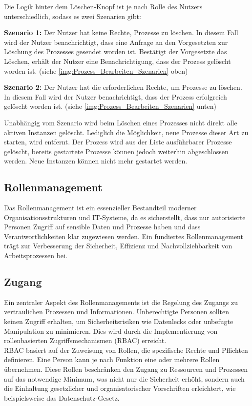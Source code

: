 Die Logik hinter dem Löschen-Knopf ist je nach Rolle des Nutzers unterschiedlich, sodass es zwei Szenarien gibt:

\textbf{Szenario 1:} Der Nutzer hat keine Rechte, Prozesse zu löschen.
In diesem Fall wird der Nutzer benachrichtigt, dass eine Anfrage an den Vorgesetzten zur Löschung des Prozesses gesendet worden ist. Bestätigt der Vorgesetzte das Löschen, erhält der Nutzer eine Benachrichtigung, dass der Prozess gelöscht worden ist. (siehe \autoref{img:Prozess_Bearbeiten_Szenarien} oben)

\textbf{Szenario 2:} Der Nutzer hat die erforderlichen Rechte, um Prozesse zu löschen.
In diesem Fall wird der Nutzer benachrichtigt, dass der Prozess erfolgreich gelöscht worden ist. (siehe \autoref{img:Prozess_Bearbeiten_Szenarien} unten)

Unabhängig vom Szenario wird beim Löschen eines Prozesses nicht direkt alle aktiven Instanzen gelöscht. Lediglich die Möglichkeit, neue Prozesse dieser Art zu starten, wird entfernt. Der Prozess wird aus der Liste ausführbarer Prozesse gelöscht, bereits gestartete Prozesse können jedoch weiterhin abgeschlossen werden. Neue Instanzen können nicht mehr gestartet werden.


\newpage


\subsection{Rollenmanagement} \label{Rollenmanagement}
Das Rollenmanagement ist ein essenzieller Bestandteil moderner Organisationsstrukturen und \ac{IT}-Systeme, da es sicherstellt, dass nur autorisierte Personen Zugriff auf sensible Daten und Prozesse haben und dass Verantwortlichkeiten klar zugewiesen werden. Ein fundiertes Rollenmanagement trägt zur Verbesserung der Sicherheit, Effizienz und Nachvollziehbarkeit von Arbeitsprozessen bei. \cite[Vgl.][]{Sandhu1998} \cite[Vgl.][]{Sandhu}

\subsection*{Zugang}
Ein zentraler Aspekt des Rollenmanagements ist die Regelung des Zugangs zu vertraulichen Prozessen und Informationen. Unberechtigte Personen sollten keinen Zugriff erhalten, um Sicherheitsrisiken wie Datenlecks oder unbefugte Manipulation zu minimieren. Dies wird durch die Implementierung von rollenbasierten Zugriffsmechanismen (\acs{RBAC}) erreicht.\\
\ac{RBAC} basiert auf der Zuweisung von Rollen, die spezifische Rechte und Pflichten definieren. Eine Person kann je nach Funktion eine oder mehrere Rollen übernehmen. Diese Rollen beschränken den Zugang zu Ressourcen und Prozessen auf das notwendige Minimum, was nicht nur die Sicherheit erhöht, sondern auch die Einhaltung gesetzlicher und organisatorischer Vorschriften erleichtert, wie beispielsweise das Datenschutz-Gesetz. \cite[Vgl.][]{Sandhu1998} \cite[Vgl.][]{Sandhu}


